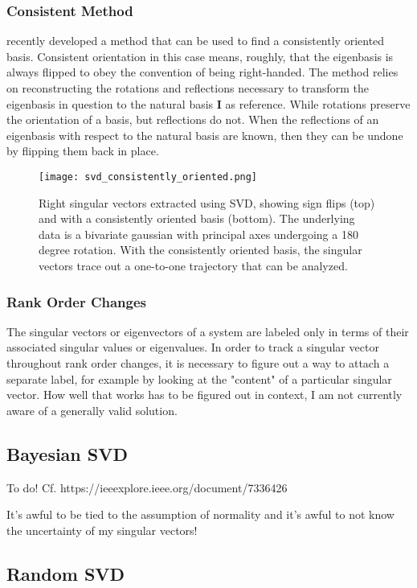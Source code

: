 \subsubsection{Consistent Method}

 recently developed a method that can be used to find a consistently oriented basis. Consistent orientation in this case means, roughly, that the eigenbasis is always flipped to obey the convention of being right-handed. The method relies on reconstructing the rotations and reflections necessary to transform the eigenbasis in question to the natural basis $\mathbf{I}$ as reference. While rotations preserve the orientation of a basis, but reflections do not. When the reflections of an eigenbasis with respect to the natural basis are known, then they can be undone by flipping them back in place. 


\begin{figure}
\centering
    \texttt{[image: svd\_consistently\_oriented.png]}
    \caption{Right singular vectors extracted using SVD, showing sign flips (top) and with a consistently oriented basis (bottom). The underlying data is a bivariate gaussian with principal axes undergoing a 180 degree rotation. With the consistently oriented basis, the singular vectors trace out a one-to-one trajectory that can be analyzed.}
    \label{fig:svd_consistently_oriented}
\end{figure}


\subsubsection{Rank Order Changes}

The singular vectors or eigenvectors of a system are labeled only in terms of their associated singular values or eigenvalues. In order to track a singular vector throughout rank order changes, it is necessary to figure out a way to attach a separate label, for example by looking at the "content" of a particular singular vector. How well that works has to be figured out in context, I am not currently aware of a generally valid solution. 


\subsection{Bayesian SVD}
To do! Cf. https://ieeexplore.ieee.org/document/7336426

It's awful to be tied to the assumption of normality and it's awful to not know the uncertainty of my singular vectors!


\subsection{Random SVD}
\label{sec:rsvd}




